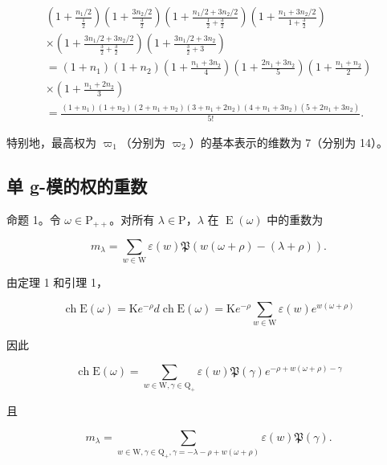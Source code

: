 \[
\begin{array}{c} \left(1 + \frac {n _ {1} / 2}{\frac {1}{2}}\right) \left(1 + \frac {3 n _ {2} / 2}{\frac {3}{2}}\right) \left(1 + \frac {n _ {1} / 2 + 3 n _ {2} / 2}{\frac {1}{2} + \frac {3}{2}}\right) \left(1 + \frac {n _ {1} + 3 n _ {2} / 2}{1 + \frac {3}{2}}\right) \\ \times \left(1 + \frac {3 n _ {1} / 2 + 3 n _ {2} / 2}{\frac {3}{2} + \frac {3}{2}}\right) \left(1 + \frac {3 n _ {1} / 2 + 3 n _ {2}}{\frac {3}{2} + 3}\right) \\ = (1 + n _ {1}) (1 + n _ {2}) \left(1 + \frac {n _ {1} + 3 n _ {2}}{4}\right) \left(1 + \frac {2 n _ {1} + 3 n _ {2}}{5}\right) \left(1 + \frac {n _ {1} + n _ {2}}{2}\right) \\ \times \left(1 + \frac {n _ {1} + 2 n _ {2}}{3}\right) \\ = \frac {(1 + n _ {1}) (1 + n _ {2}) (2 + n _ {1} + n _ {2}) (3 + n _ {1} + 2 n _ {2}) (4 + n _ {1} + 3 n _ {2}) (5 + 2 n _ {1} + 3 n _ {2})}{5 !}. \end{array}
\]

特别地，最高权为 \(\varpi_{1}\)（分别为 \(\varpi_{2}\)）的基本表示的维数为 7（分别为 14）。

\subsection{单 g-模的权的重数}

命题 1。令 \(\omega \in \mathrm{P}_{++}\)。对所有 \(\lambda \in \mathrm{P}\)，\(\lambda\) 在 \(\operatorname{E}(\omega)\) 中的重数为

\[
m _ {\lambda} = \sum_ {w \in \mathrm{W}} \varepsilon (w) \mathfrak {P} (w (\omega + \rho) - (\lambda + \rho)).
\]

由定理 1 和引理 1，

\[
\operatorname{ch} \mathrm{E} (\omega) = \mathrm{K} e ^ {- \rho} d \operatorname{ch} \mathrm{E} (\omega) = \mathrm{K} e ^ {- \rho} \sum_ {w \in \mathrm{W}} \varepsilon (w) e ^ {w (\omega + \rho)}
\]

因此

\[
\operatorname{ch} \mathrm{E} (\omega) = \sum_ {w \in \mathrm{W}, \gamma \in \mathrm{Q} _ {+}} \varepsilon (w) \mathfrak {P} (\gamma) e ^ {- \rho + w (\omega + \rho) - \gamma}
\]

且

\[
m _ {\lambda} = \sum_ {w \in \mathrm{W}, \gamma \in \mathrm{Q} _ {+}, \gamma = - \lambda - \rho + w (\omega + \rho)} \varepsilon (w) \mathfrak {P} (\gamma).
\]

